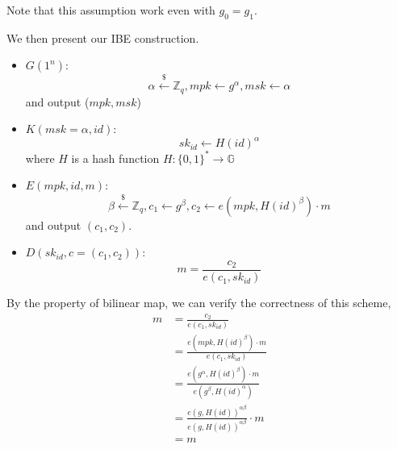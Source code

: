 Note that this assumption work even with $g_0=g_1$.

We then present our IBE construction. 
\begin{itemize}
    \item $G(1^n)$: 
    \[
    \alpha\stackrel{\$}{\gets}\mathbb{Z}_q, mpk\gets g^\alpha, msk\gets\alpha
    \]
    and output ($mpk,msk$)
    \item $K(msk=\alpha,id)$:
    \[
    sk_{id}\gets H(id)^\alpha
    \]
    where $H$ is a hash function $H:\{0,1\}^{*}\rightarrow\mathbb{G}$
    \item $E(mpk, id, m)$: 
    \[
    \beta\stackrel{\$}{\gets}\mathbb{Z}_q, c_1\gets g^{\beta}, c_2\gets e(mpk,H(id)^{\beta})\cdot m
    \]
    and output $(c_1,c_2)$.
    \item $D(sk_{id}, c=(c_1, c_2))$:
    \[
    m=\frac{c_2}{e(c_1,sk_{id})}
    \]
\end{itemize}
By the property of bilinear map, we can verify the correctness of this scheme, 
\begin{align*}
    m &= \frac{c_2}{e(c_1,sk_{id})} \\
      &= \frac{e(mpk,H(id)^{\beta})\cdot m}{e(c_1,sk_{id})} \\
      &= \frac{e(g^\alpha,H(id)^{\beta})\cdot m}{e(g^{\beta}, H(id)^{\alpha})} \\
      &= \frac{e(g,H(id))^{\alpha\beta}}{e(g, H(id))^{\alpha\beta}}\cdot m \\
      &= m
\end{align*}

